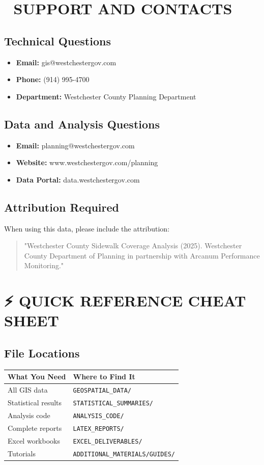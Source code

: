 \documentclass[11pt,letterpaper]{article}
\begin{document}
\section{💬 SUPPORT AND CONTACTS}

\subsection{Technical Questions}
\begin{itemize}
    \item \textbf{Email:} gis@westchestergov.com
    \item \textbf{Phone:} (914) 995-4700
    \item \textbf{Department:} Westchester County Planning Department
\end{itemize}

\subsection{Data and Analysis Questions}
\begin{itemize}
    \item \textbf{Email:} planning@westchestergov.com
    \item \textbf{Website:} www.westchestergov.com/planning
    \item \textbf{Data Portal:} data.westchestergov.com
\end{itemize}

\subsection{Attribution Required}
When using this data, please include the attribution:
\begin{quote}
"Westchester County Sidewalk Coverage Analysis (2025). Westchester County Department of Planning in partnership with Arcanum Performance Monitoring."
\end{quote}

\section{⚡ QUICK REFERENCE CHEAT SHEET}

\subsection{File Locations}
\begin{tabular}{ll}
\toprule
\textbf{What You Need} & \textbf{Where to Find It} \\
\midrule
All GIS data & \texttt{GEOSPATIAL\_DATA/} \\
Statistical results & \texttt{STATISTICAL\_SUMMARIES/} \\
Analysis code & \texttt{ANALYSIS\_CODE/} \\
Complete reports & \texttt{LATEX\_REPORTS/} \\
Excel workbooks & \texttt{EXCEL\_DELIVERABLES/} \\
Tutorials & \texttt{ADDITIONAL\_MATERIALS/GUIDES/} \\
\bottomrule
\end{tabular}
\end{document}
